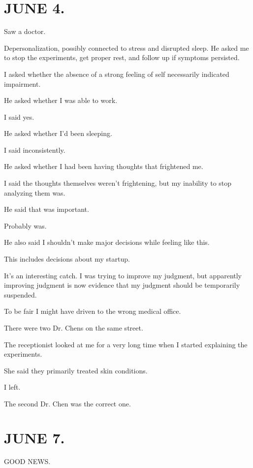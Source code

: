 \documentclass[11pt,oneside]{book}
\begin{document}
\section*{JUNE 4.}

Saw a doctor.

Depersonalization, possibly connected to stress and disrupted sleep. He asked me to stop the experiments, get proper rest, and follow up if symptoms persisted.

I asked whether the absence of a strong feeling of self necessarily indicated impairment.

He asked whether I was able to work.

I said yes.

He asked whether I'd been sleeping.

I said inconsistently.

He asked whether I had been having thoughts that frightened me.

I said the thoughts themselves weren't frightening, but my inability to stop analyzing them was.

He said that was important.

Probably was.

He also said I shouldn't make major decisions while feeling like this.

This includes decisions about my startup.

It's an interesting catch. I was trying to improve my judgment, but apparently improving judgment is now evidence that my judgment should be temporarily suspended.

To be fair I might have driven to the wrong medical office.

There were two Dr. Chens on the same street.

The receptionist looked at me for a very long time when I started explaining the experiments.

She said they primarily treated skin conditions.

I left.

The second Dr. Chen was the correct one.

\section*{JUNE 7.}

GOOD NEWS.
\end{document}
